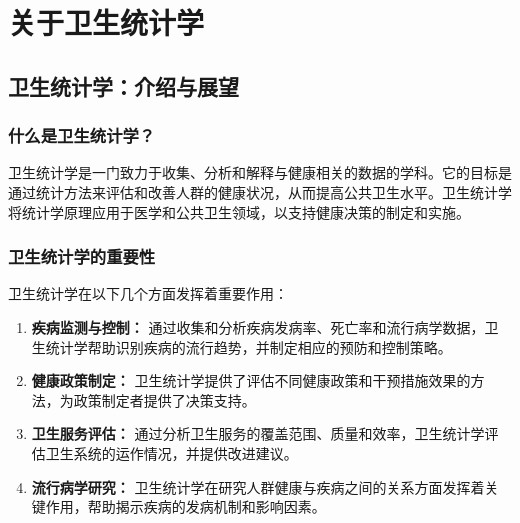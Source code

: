 \documentclass[
]{book}
\theoremstyle{definition}
\theoremstyle{definition}
\theoremstyle{definition}
\theoremstyle{definition}
\theoremstyle{remark}
\begin{document}
\hypertarget{ux5173ux4e8eux536bux751fux7edfux8ba1ux5b66}{%
\chapter{关于卫生统计学}\label{ux5173ux4e8eux536bux751fux7edfux8ba1ux5b66}}

\hypertarget{ux536bux751fux7edfux8ba1ux5b66ux4ecbux7ecdux4e0eux5c55ux671b}{%
\section{卫生统计学：介绍与展望}\label{ux536bux751fux7edfux8ba1ux5b66ux4ecbux7ecdux4e0eux5c55ux671b}}

\hypertarget{ux4ec0ux4e48ux662fux536bux751fux7edfux8ba1ux5b66}{%
\subsection{什么是卫生统计学？}\label{ux4ec0ux4e48ux662fux536bux751fux7edfux8ba1ux5b66}}

卫生统计学是一门致力于收集、分析和解释与健康相关的数据的学科。它的目标是通过统计方法来评估和改善人群的健康状况，从而提高公共卫生水平。卫生统计学将统计学原理应用于医学和公共卫生领域，以支持健康决策的制定和实施。

\hypertarget{ux536bux751fux7edfux8ba1ux5b66ux7684ux91cdux8981ux6027}{%
\subsection{卫生统计学的重要性}\label{ux536bux751fux7edfux8ba1ux5b66ux7684ux91cdux8981ux6027}}

卫生统计学在以下几个方面发挥着重要作用：

\begin{enumerate}
\def\labelenumi{\arabic{enumi}.}
\item
  \textbf{疾病监测与控制：} 通过收集和分析疾病发病率、死亡率和流行病学数据，卫生统计学帮助识别疾病的流行趋势，并制定相应的预防和控制策略。
\item
  \textbf{健康政策制定：} 卫生统计学提供了评估不同健康政策和干预措施效果的方法，为政策制定者提供了决策支持。
\item
  \textbf{卫生服务评估：} 通过分析卫生服务的覆盖范围、质量和效率，卫生统计学评估卫生系统的运作情况，并提供改进建议。
\item
  \textbf{流行病学研究：} 卫生统计学在研究人群健康与疾病之间的关系方面发挥着关键作用，帮助揭示疾病的发病机制和影响因素。
\end{enumerate}
\end{document}
